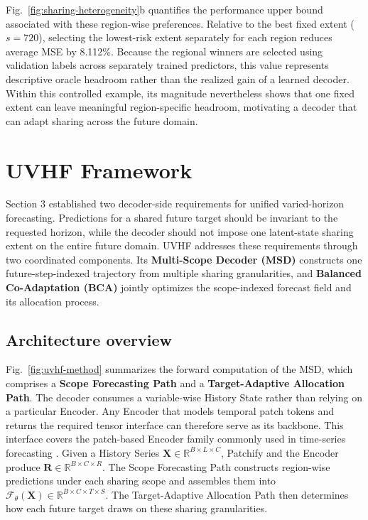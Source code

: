 \documentclass[final,3p,times]{elsarticle}
\begin{document}
Fig.~\ref{fig:sharing-heterogeneity}b quantifies the performance upper bound associated with these region-wise preferences. Relative to the best fixed extent ($s=720$), selecting the lowest-risk extent separately for each region reduces average MSE by 8.112\%. Because the regional winners are selected using validation labels across separately trained predictors, this value represents descriptive oracle headroom rather than the realized gain of a learned decoder. Within this controlled example, its magnitude nevertheless shows that one fixed extent can leave meaningful region-specific headroom, motivating a decoder that can adapt sharing across the future domain.

\section{UVHF Framework}
\label{sec:method}


Section 3 established two decoder-side requirements for unified varied-horizon forecasting. Predictions for a shared future target should be invariant to the requested horizon, while the decoder should not impose one latent-state sharing extent on the entire future domain. UVHF addresses these requirements through two coordinated components. Its \textbf{Multi-Scope Decoder (MSD)} constructs one future-step-indexed trajectory from multiple sharing granularities, and \textbf{Balanced Co-Adaptation (BCA)} jointly optimizes the scope-indexed forecast field and its allocation process.

\subsection{Architecture overview}


Fig.~\ref{fig:uvhf-method} summarizes the forward computation of the MSD, which comprises a \textbf{Scope Forecasting Path} and a \textbf{Target-Adaptive Allocation Path}. The decoder consumes a variable-wise History State rather than relying on a particular Encoder. Any Encoder that models temporal patch tokens and returns the required tensor interface can therefore serve as its backbone. This interface covers the patch-based Encoder family commonly used in time-series forecasting \citep{nie2023patchtst,zhang2023crossformer}. Given a History Series $\mathbf X\in\mathbb R^{B\times L\times C}$, Patchify and the Encoder produce $\mathbf R\in\mathbb R^{B\times C\times R}$. The Scope Forecasting Path constructs region-wise predictions under each sharing scope and assembles them into $\mathcal F_\theta(\mathbf X)\in\mathbb R^{B\times C\times T\times S}$. The Target-Adaptive Allocation Path then determines how each future target draws on these sharing granularities.
\end{document}
